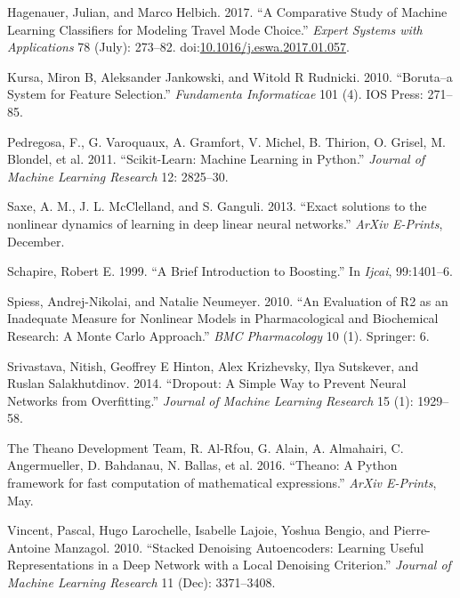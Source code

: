 \documentclass[]{article}
\begin{document}
\hypertarget{ref-hagenauer_comparative_2017}{}
Hagenauer, Julian, and Marco Helbich. 2017. ``A Comparative Study of
Machine Learning Classifiers for Modeling Travel Mode Choice.''
\emph{Expert Systems with Applications} 78 (July): 273--82.
doi:\href{https://doi.org/10.1016/j.eswa.2017.01.057}{10.1016/j.eswa.2017.01.057}.

\hypertarget{ref-kursa2010boruta}{}
Kursa, Miron B, Aleksander Jankowski, and Witold R Rudnicki. 2010.
``Boruta--a System for Feature Selection.'' \emph{Fundamenta
Informaticae} 101 (4). IOS Press: 271--85.

\hypertarget{ref-scikit-learn}{}
Pedregosa, F., G. Varoquaux, A. Gramfort, V. Michel, B. Thirion, O.
Grisel, M. Blondel, et al. 2011. ``Scikit-Learn: Machine Learning in
Python.'' \emph{Journal of Machine Learning Research} 12: 2825--30.

\hypertarget{ref-2013arXiv1312.6120S}{}
Saxe, A. M., J. L. McClelland, and S. Ganguli. 2013. ``Exact solutions
to the nonlinear dynamics of learning in deep linear neural networks.''
\emph{ArXiv E-Prints}, December.

\hypertarget{ref-schapire1999brief}{}
Schapire, Robert E. 1999. ``A Brief Introduction to Boosting.'' In
\emph{Ijcai}, 99:1401--6.

\hypertarget{ref-spiess2010evaluation}{}
Spiess, Andrej-Nikolai, and Natalie Neumeyer. 2010. ``An Evaluation of
R2 as an Inadequate Measure for Nonlinear Models in Pharmacological and
Biochemical Research: A Monte Carlo Approach.'' \emph{BMC Pharmacology}
10 (1). Springer: 6.

\hypertarget{ref-srivastava2014dropout}{}
Srivastava, Nitish, Geoffrey E Hinton, Alex Krizhevsky, Ilya Sutskever,
and Ruslan Salakhutdinov. 2014. ``Dropout: A Simple Way to Prevent
Neural Networks from Overfitting.'' \emph{Journal of Machine Learning
Research} 15 (1): 1929--58.

\hypertarget{ref-2016arXiv160502688T}{}
The Theano Development Team, R. Al-Rfou, G. Alain, A. Almahairi, C.
Angermueller, D. Bahdanau, N. Ballas, et al. 2016. ``Theano: A Python
framework for fast computation of mathematical expressions.''
\emph{ArXiv E-Prints}, May.

\hypertarget{ref-vincent2010stacked}{}
Vincent, Pascal, Hugo Larochelle, Isabelle Lajoie, Yoshua Bengio, and
Pierre-Antoine Manzagol. 2010. ``Stacked Denoising Autoencoders:
Learning Useful Representations in a Deep Network with a Local Denoising
Criterion.'' \emph{Journal of Machine Learning Research} 11 (Dec):
3371--3408.
\end{document}
